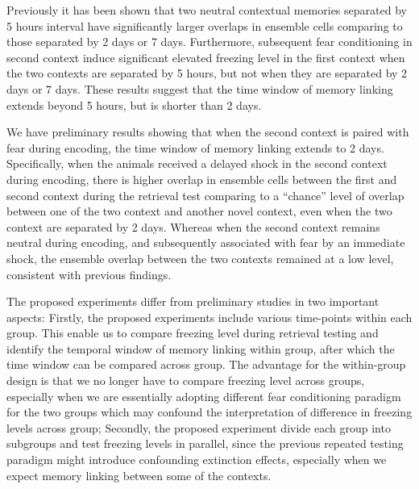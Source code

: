 \documentclass[master.tex]{subfiles}
\begin{document}
Previously it has been shown that two neutral contextual memories separated by 5
hours interval have significantly larger overlaps in ensemble cells comparing to
those separated by 2 days or 7 days. Furthermore, subsequent fear conditioning
in second context induce significant elevated freezing level in the first
context when the two contexts are separated by 5 hours, but not when they are
separated by 2 days or 7 days. These results suggest that the time window of
memory linking extends beyond 5 hours, but is shorter than 2 days.

We have preliminary results showing that when the second context is paired with
fear during encoding, the time window of memory linking extends to 2 days.
Specifically, when the animals received a delayed shock in the second context
during encoding, there is higher overlap in ensemble cells between the first and
second context during the retrieval test comparing to a ``chance'' level of
overlap between one of the two context and another novel context, even when the
two context are separated by 2 days. Whereas when the second context remains
neutral during encoding, and subsequently associated with fear by an immediate
shock, the ensemble overlap between the two contexts remained at a low level,
consistent with previous findings.

The proposed experiments differ from preliminary studies in two important
aspects: Firstly, the proposed experiments include various time-points within
each group. This enable us to compare freezing level during retrieval testing
and identify the temporal window of memory linking within group, after which the
time window can be compared across group. The advantage for the within-group
design is that we no longer have to compare freezing level across groups,
especially when we are essentially adopting different fear conditioning paradigm
for the two groups which may confound the interpretation of difference in
freezing levels across group; Secondly, the proposed experiment divide each
group into subgroups and test freezing levels in parallel, since the previous
repeated testing paradigm might introduce confounding extinction effects,
especially when we expect memory linking between some of the contexts.
\end{document}

